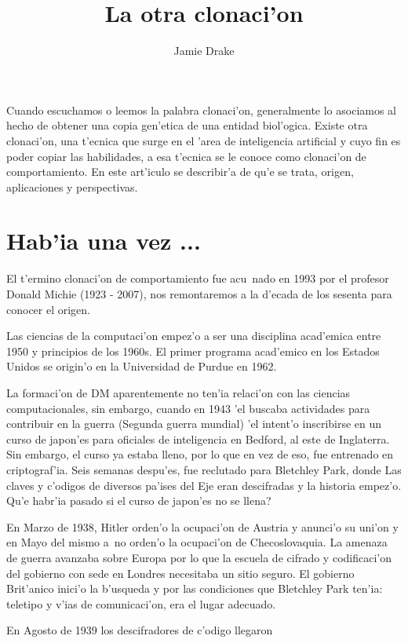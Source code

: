 \documentclass[11pt]{article}
\begin{document}
\title{La otra clonaci'on}
\author{Jamie Drake}

\maketitle
Cuando escuchamos o leemos la palabra clonaci'on, generalmente lo asociamos al hecho de obtener una copia gen'etica de una entidad biol'ogica. Existe otra clonaci'on, una t'ecnica que surge en el 'area de inteligencia artificial y cuyo fin es poder copiar las habilidades, a esa t'ecnica se le conoce como clonaci'on de comportamiento. En este art'iculo se describir'a de qu'e se trata, origen, aplicaciones y perspectivas.


\section{Hab'ia una vez ...}
El t'ermino clonaci'on de comportamiento fue acu~nado en 1993 por el profesor Donald Michie (1923 - 2007), nos remontaremos a la d'ecada de los sesenta para conocer el origen.

Las ciencias de la computaci'on empez'o a ser una disciplina acad'emica entre 1950 y principios de los 1960s. El primer programa acad'emico en los Estados Unidos se origin'o en la Universidad de Purdue en 1962.

La formaci'on de DM aparentemente no ten'ia relaci'on con las ciencias computacionales, sin embargo, cuando en 1943 'el buscaba actividades para contribuir en la guerra (Segunda guerra mundial) 'el intent'o inscribirse en un curso de japon'es para oficiales de inteligencia en Bedford, al este de Inglaterra. Sin embargo, el curso ya estaba lleno, por lo que en vez de eso, fue entrenado en criptograf'ia. Seis semanas despu'es, fue reclutado para Bletchley Park, donde Las claves y c'odigos de diversos pa'ises del Eje eran descifradas y la historia empez'o. Qu'e habr'ia pasado si el curso de japon'es no se llena?

En Marzo de 1938, Hitler orden'o la ocupaci'on de Austria y anunci'o su uni'on y en Mayo del mismo a~no orden'o la ocupaci'on de Checoslovaquia. La amenaza de guerra avanzaba sobre Europa por lo que la escuela de cifrado y codificaci'on del gobierno con sede en Londres necesitaba un sitio seguro. El gobierno Brit'anico inici'o la b'usqueda y por las condiciones que Bletchley Park ten'ia: teletipo y v'ias de comunicaci'on, era el lugar adecuado. 

En Agosto de 1939 los descifradores de c'odigo llegaron
\end{document}
